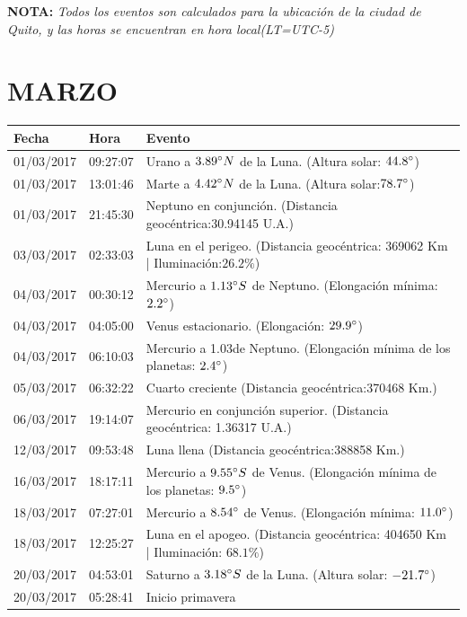 \documentclass[12pt,a4paper,oneside]{article}
\begin{document}
\vspace{1cm}
\textbf{NOTA:  }\textit{Todos los eventos son calculados para la ubicaci\'on de la ciudad de Quito, y las horas se encuentran en hora local(LT=UTC-5)}
\vspace{0.7cm}
\newpage
\section{MARZO}
\begin{center}
\begin{tabular}{ |l| l| l| }
\hline
 \textbf{Fecha} & \textbf{Hora} & \textbf{Evento}\\
 \hline
01/03/2017& 09:27:07 &	Urano a $3.89\degree N$ de la Luna. (Altura solar: $44.8\degree$)	\\
01/03/2017& 13:01:46 &	Marte a $4.42\degree N$ de la Luna. (Altura solar:$ 78.7\degree$)	\\
01/03/2017& 21:45:30 &	Neptuno en conjunción. (Distancia geocéntrica:30.94145 U.A.)	\\
03/03/2017& 02:33:03 &	Luna en el perigeo. (Distancia geocéntrica: 369062 Km | Iluminación:$ 26.2\%$)	\\
04/03/2017& 00:30:12 &	Mercurio a $1.13\degree S$ de Neptuno. (Elongación mínima: $2.2\degree$)	\\
04/03/2017& 04:05:00 &	Venus estacionario. (Elongación: $29.9\degree$)	\\
04/03/2017& 06:10:03 &	Mercurio a 1.03\degree de Neptuno. (Elongación mínima de los planetas: $2.4\degree$)	\\
05/03/2017& 06:32:22 &	Cuarto creciente (Distancia geocéntrica:370468 Km.)	\\
06/03/2017& 19:14:07 &	Mercurio en conjunción superior. (Distancia geocéntrica: 1.36317 U.A.)	\\
12/03/2017& 09:53:48 &	Luna llena (Distancia geocéntrica:388858 Km.)	\\
16/03/2017& 18:17:11 &	Mercurio a $9.55\degree S$ de Venus. (Elongación mínima de los planetas: $9.5\degree$)	\\
18/03/2017& 07:27:01 &	Mercurio a $8.54\degree$ de Venus. (Elongación mínima: $11.0\degree$)	\\
18/03/2017& 12:25:27 &	Luna en el apogeo. (Distancia geocéntrica: 404650 Km | Iluminación: $68.1\%$)	\\
20/03/2017& 04:53:01 &	Saturno a $3.18\degree S$ de la Luna. (Altura solar: $-21.7\degree$)	\\
20/03/2017& 05:28:41 &	Inicio primavera	\\

\end{tabular}
\end{center}
\end{document}

